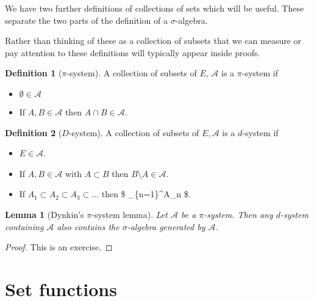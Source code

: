 \documentclass[
]{book}
\providecommand{\tightlist}{%
  \setlength{\itemsep}{0pt}\setlength{\parskip}{0pt}}
\newtheorem{lemma}{Lemma}[chapter]
\theoremstyle{definition}
\newtheorem{definition}{Definition}[chapter]
\theoremstyle{definition}
\theoremstyle{definition}
\theoremstyle{definition}
\theoremstyle{remark}
\begin{document}
We have two further definitions of collections of sets which will be useful. These separate the two parts of the definition of a \(\sigma\)-algebra.

Rather than thinking of these as a collection of subsets that we can measure or pay attention to these definitions will typically appear inside proofs.

\begin{definition}[$\pi$-system]

A collection of subsets of \(E\), \(\mathcal{A}\) is a \(\pi\)-system if

\begin{itemize}
\tightlist
\item
  \(\emptyset \in \mathcal{A}\)
\item
  If \(A, B \in \mathcal{A}\) then \(A \cap B \in \mathcal{A}\).
\end{itemize}

\end{definition}

\begin{definition}[$D$-system]

A collection of subsets of \(E, \mathcal{A}\) is a \(d\)-system if

\begin{itemize}
\tightlist
\item
  \(E \in \mathcal{A}\).
\item
  If \(A, B \in \mathcal{A}\) with \(A \subset B\) then \(B \setminus A \in \mathcal{A}\).
\item
  If \(A_1 \subset A_2 \subset A_3 \subset \dots\) then \$ \bigcup\_\{n=1\}\^{}\infty A\_n \in {}\$.
\end{itemize}

\end{definition}

\begin{lemma}[Dynkin's $\pi$-system lemma]
Let \(\mathcal{A}\) be a \(\pi\)-system. Then any \(d\)-system containing \(\mathcal{A}\) also contains the \(\sigma\)-algebra generated by \(\mathcal{A}\).
\end{lemma}

\begin{proof}
This is an exercise.
\end{proof}

\hypertarget{set-functions}{%
\section{Set functions}\label{set-functions}}
\end{document}
